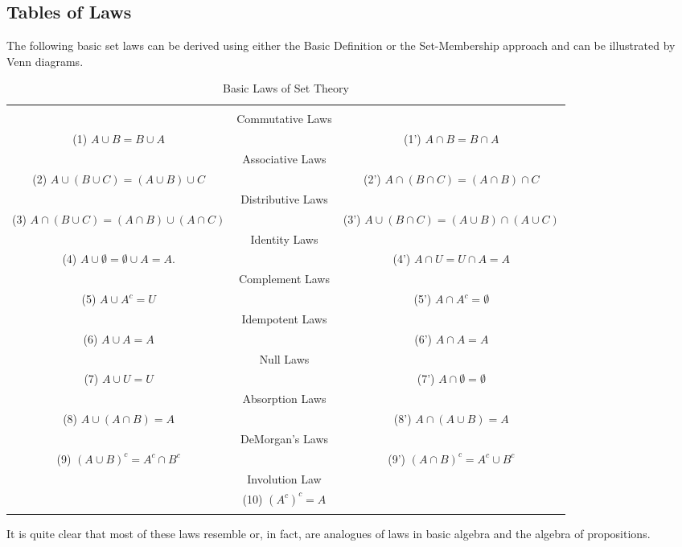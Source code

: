 \documentclass[10pt,]{book}
\theoremstyle{plain}
\theoremstyle{definition}
\theoremstyle{definition}
\theoremstyle{definition}
\newcommand{\hrulethin}  {\noalign{\hrule height 0.04em}}
\begin{document}
\subsection[Tables of Laws]{Tables of Laws}\label{subsection-5}
The following basic set laws can be derived using either the Basic Definition or the Set-Membership approach and can be illustrated by Venn diagrams.%
\leavevmode%
\begin{table}
\centering
\begin{tabular}{ccc}
&&\tabularnewline[0pt]
 &Commutative Laws& \tabularnewline[0pt]
(1) \(A \cup B = B \cup  A\)& &(1') \(A \cap B = B\cap A\) 
\tabularnewline\hrulethin
&Associative Laws&\tabularnewline[0pt]
(2) \(A \cup  (B \cup  C)= (A\cup B)\cup C\) &&(2') \(A \cap  (B \cap  C) = (A \cap  B) \cap  C \)\tabularnewline\hrulethin
&Distributive Laws&\tabularnewline[0pt]
(3) \(A\cap (B \cup  C)=(A\cap B )\cup (A\cap  C)\) &&(3') \(A \cup (B \cap C) = (A \cup B ) \cap (A\cup C)\)\tabularnewline\hrulethin
&Identity Laws&\tabularnewline[0pt]
(4) \(A \cup  \emptyset  = \emptyset  \cup  A = A\).&&(4') \(A \cap  U = U \cap  A = A\)
\tabularnewline\hrulethin
&Complement Laws&\tabularnewline[0pt]
(5) \(A\cup A^c= U\)&&(5') \(A\cap A^c= \emptyset\)\tabularnewline\hrulethin
&Idempotent Laws&\tabularnewline[0pt]
(6) \(A \cup  A = A\)&& (6') \(A\cap  A = A\)\tabularnewline\hrulethin
&Null Laws&\tabularnewline[0pt]
(7) \(A \cup  U = U\)&&(7') \(A \cap  \emptyset  =\emptyset\)\tabularnewline\hrulethin
&Absorption Laws&\tabularnewline[0pt]
(8) \(A \cup  (A\cap  B) = A\)&&(8') \(A\cap (A \cup  B) = A\)\tabularnewline\hrulethin
&DeMorgan's Laws&\tabularnewline[0pt]
(9) \((A \cup  B)^c= A^c\cap  B^c\)&& (9') \((A\cap  B)^c = A^c \cup  B^c\)\tabularnewline\hrulethin
&Involution Law&\tabularnewline[0pt]
&(10) \((A^c)^c= A\)&\tabularnewline\hrulethin
\end{tabular}
\caption{Basic Laws of Set Theory\label{table-set-laws}}
\end{table}
\par
It is quite clear that most of these laws resemble or, in fact, are analogues of laws in basic algebra and the algebra of propositions.%
\typeout{************************************************}
\typeout{************************************************}
\end{document}
